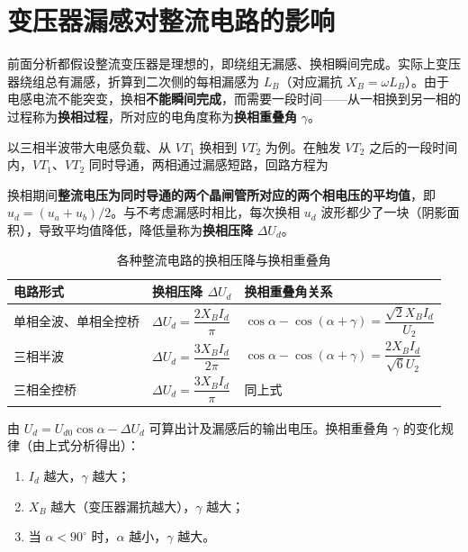 \section{变压器漏感对整流电路的影响}

前面分析都假设整流变压器是理想的，即绕组无漏感、换相瞬间完成。实际上变压器绕组总有漏感，折算到二次侧的每相漏感为 $L_B$（对应漏抗 $X_B=\omega L_B$）。由于电感电流不能突变，换相\textbf{不能瞬间完成}，而需要一段时间——从一相换到另一相的过程称为\textbf{换相过程}，所对应的电角度称为\textbf{换相重叠角} $\gamma$。

以三相半波带大电感负载、从 $VT_1$ 换相到 $VT_2$ 为例。在触发 $VT_2$ 之后的一段时间内，$VT_1$、$VT_2$ 同时导通，两相通过漏感短路，回路方程为


换相期间\textbf{整流电压为同时导通的两个晶闸管所对应的两个相电压的平均值}，即 $u_d=(u_a+u_b)/2$。与不考虑漏感时相比，每次换相 $u_d$ 波形都少了一块（阴影面积），导致平均值降低，降低量称为\textbf{换相压降} $\Delta U_d$。

\begin{table}[htbp]
\centering
\caption{各种整流电路的换相压降与换相重叠角}
\label{tab:3-2}
\begin{tabular}{lll}
\toprule
\textbf{电路形式} & \textbf{换相压降 $\Delta U_d$} & \textbf{换相重叠角关系} \\
\midrule
单相全波、单相全控桥 & $\Delta U_d=\dfrac{2X_BI_d}{\pi}$ & $\cos\alpha-\cos(\alpha+\gamma)=\dfrac{\sqrt{2}X_BI_d}{U_2}$ \\
三相半波 & $\Delta U_d=\dfrac{3X_BI_d}{2\pi}$ & $\cos\alpha-\cos(\alpha+\gamma)=\dfrac{2X_BI_d}{\sqrt{6}U_2}$ \\
三相全控桥 & $\Delta U_d=\dfrac{3X_BI_d}{\pi}$ & 同上式 \\
\bottomrule
\end{tabular}
\end{table}

由 $U_d=U_{d0}\cos\alpha-\Delta U_d$ 可算出计及漏感后的输出电压。换相重叠角 $\gamma$ 的变化规律（由上式分析得出）：

\begin{enumerate}
  \item $I_d$ 越大，$\gamma$ 越大；
  \item $X_B$ 越大（变压器漏抗越大），$\gamma$ 越大；
  \item 当 $\alpha<90^\circ$ 时，$\alpha$ 越小，$\gamma$ 越大。
\end{enumerate}

